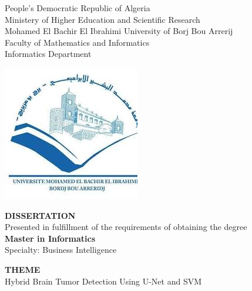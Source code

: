 
\thispagestyle{empty}
\begin{center}
  \begin{spacing}{1.15}
    People’s Democratic Republic of Algeria \\
    Ministery of Higher Education and Scientific Research \\
    Mohamed El Bachir El Ibrahimi University of Borj Bou Arrerij\\
    Faculty of Mathematics and Informatics\\
    Informatics Department\\
    \vspace{0.5cm}

    \includegraphics[scale=0.5]{Images/logo.jpeg}


    \fontsize{13}{15}\selectfont \textbf{DISSERTATION}\\
    Presented in fulfillment of the requirements of obtaining the degree\\
    \fontsize{13}{15}\selectfont \textbf{Master in Informatics} \\
    Specialty: Business Intelligence\\


    \vspace{1.5cm}

    \fontsize{19}{22}\selectfont \textbf{THEME} \\
    \fontsize{19}{22}\selectfont Hybrid Brain Tumor Detection Using U-Net and SVM\\

  \end{spacing}
\end{center}

\vspace{0.5cm}

